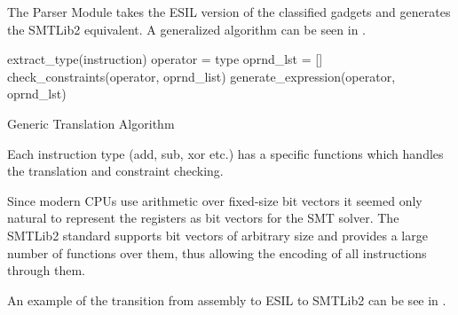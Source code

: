 The Parser Module takes the ESIL version of the classified gadgets and generates the SMTLib2 equivalent.
A generalized algorithm can be seen in .

\begin{algorithm}[htp]
	extract_type(instruction)\;
	operator = type\;
	oprnd_lst = []\;
	check_constraints(operator, oprnd_list)\;
	generate_expression(operator, oprnd_lst)\;
	\caption{Generic Translation Algorithm}
	\label{alg:translate}
\end{algorithm}

Each instruction type (add, sub, xor etc.) has a specific functions which handles the translation and constraint checking.

Since modern CPUs use arithmetic over fixed-size bit vectors it seemed only natural to represent the registers as bit vectors for the SMT solver. The SMTLib2 standard supports bit vectors of arbitrary size and provides a large number of functions over them, thus allowing the encoding of all instructions through them.

An example of the transition from assembly to ESIL to SMTLib2 can be see in .

